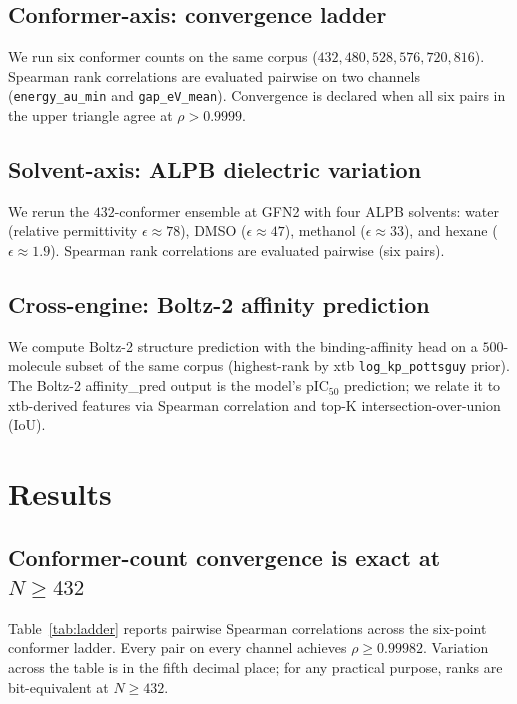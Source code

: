 \documentclass[11pt,a4paper]{article}
\begin{document}
\subsection{Conformer-axis: convergence ladder}

We run six conformer counts on the same corpus
($432, 480, 528, 576, 720, 816$). Spearman rank correlations are
evaluated pairwise on two channels (\texttt{energy\_au\_min} and
\texttt{gap\_eV\_mean}). Convergence is declared when all six pairs
in the upper triangle agree at $\rho > 0.9999$.

\subsection{Solvent-axis: ALPB dielectric variation}

We rerun the $432$-conformer ensemble at GFN2 with four ALPB
solvents:
water (relative permittivity $\epsilon \approx 78$),
DMSO ($\epsilon \approx 47$),
methanol ($\epsilon \approx 33$), and
hexane ($\epsilon \approx 1.9$).
Spearman rank correlations are evaluated pairwise (six pairs).

\subsection{Cross-engine: Boltz-2 affinity prediction}

We compute Boltz-2 \citep{boltz2_2024} structure prediction with the
binding-affinity head on a $500$-molecule subset of the same corpus
(highest-rank by xtb \texttt{log\_kp\_pottsguy} prior). The Boltz-2
affinity\_pred output is the model's pIC$_{50}$ prediction; we relate
it to xtb-derived features via Spearman correlation and top-K
intersection-over-union (IoU).

\section{Results}
\label{sec:results}

\subsection{Conformer-count convergence is exact at $N \geq 432$}
\label{sec:results-ladder}

Table~\ref{tab:ladder} reports pairwise Spearman correlations across
the six-point conformer ladder. Every pair on every channel achieves
$\rho \geq 0.99982$. Variation across the table is in the fifth
decimal place; for any practical purpose, ranks are bit-equivalent at
$N \geq 432$.
\end{document}
